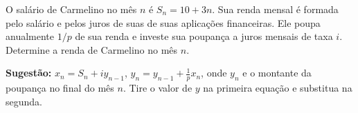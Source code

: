 \item O salário de Carmelino no mês $n$  é $S_n =10+3n$. Sua renda mensal é formada pelo salário e
pelos juros de suas de suas aplicações financeiras. Ele poupa anualmente $1/p$ de sua renda e
investe sua poupança a juros mensais de taxa $i$. Determine a renda de Carmelino no mês $n$.

{{\bf Sugestão:} $x_n=S_n +iy_{n-1}$, $y_n=y_{n-1}+\frac{1}{p}x_n$, onde $y_n$ e o montante da
poupança no final do mês $n$. Tire o valor de $y$ na primeira equação e substitua na segunda.}
